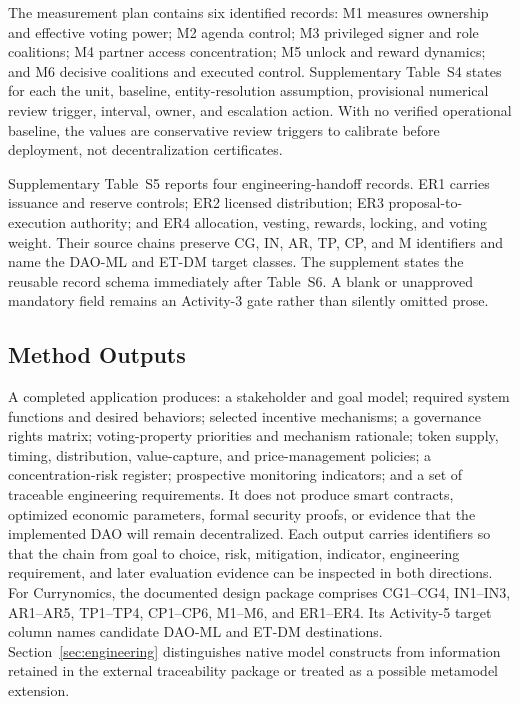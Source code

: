 \documentclass[referee,sn-basic]{sn-jnl}
\begin{document}
The measurement plan contains six identified records: M1 measures ownership and
effective voting power; M2 agenda control; M3 privileged signer and role
coalitions; M4 partner access concentration; M5 unlock and reward dynamics; and
M6 decisive coalitions and executed control. Supplementary Table~S4 states for
each the unit, baseline, entity-resolution assumption, provisional numerical
review trigger, interval, owner, and escalation action. With no verified
operational baseline, the values are conservative review triggers to calibrate
before deployment, not decentralization certificates.

Supplementary Table~S5 reports four engineering-handoff records. ER1 carries
issuance and reserve controls; ER2 licensed distribution; ER3
proposal-to-execution authority; and ER4 allocation, vesting, rewards, locking,
and voting weight. Their source chains preserve CG, IN, AR, TP, CP, and M
identifiers and name the DAO-ML and ET-DM target classes. The supplement states
the reusable record schema immediately after Table~S6. A blank or unapproved
mandatory field remains an Activity-3 gate rather than silently omitted prose.

\subsection{Method Outputs}\label{subsec:method-outputs}

A completed application produces: a stakeholder and goal model; required system
functions and desired behaviors; selected incentive mechanisms; a governance
rights matrix; voting-property priorities and mechanism rationale; token supply,
timing, distribution, value-capture, and price-management policies; a
concentration-risk register; prospective monitoring indicators; and a set of
traceable engineering requirements. It does not produce smart contracts,
optimized economic parameters, formal security proofs, or evidence that the
implemented DAO will remain decentralized. Each output carries identifiers so
that the chain from goal to choice, risk, mitigation, indicator, engineering
requirement, and later evaluation evidence can be inspected in both directions.
For Currynomics, the documented design package comprises CG1--CG4, IN1--IN3,
AR1--AR5, TP1--TP4, CP1--CP6, M1--M6, and ER1--ER4. Its Activity-5 target column
names candidate DAO-ML and ET-DM destinations. Section~\ref{sec:engineering}
distinguishes native model constructs from information retained in the external
traceability package or treated as a possible metamodel extension.
\end{document}
